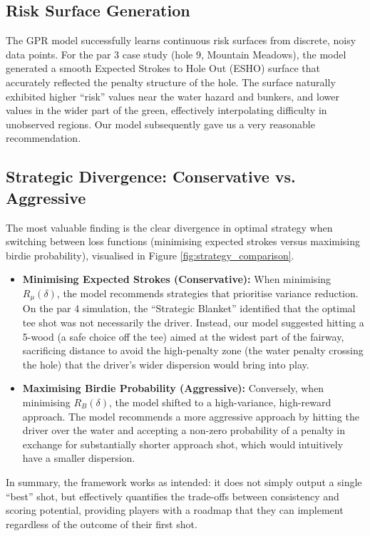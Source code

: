 \documentclass[11pt, letterpaper]{article}
\begin{document}
\subsection{Risk Surface Generation}
The GPR model successfully learns continuous risk surfaces from discrete, noisy data points. For the par 3 case study (hole 9, Mountain Meadows), the model generated a smooth Expected Strokes to Hole Out (ESHO) surface that accurately reflected the penalty structure of the hole. The surface naturally exhibited higher ``risk'' values near the water hazard and bunkers, and lower values in the wider part of the green, effectively interpolating difficulty in unobserved regions. Our model subsequently gave us a very reasonable recommendation.

\subsection{Strategic Divergence: Conservative vs. Aggressive}
The most valuable finding is the clear divergence in optimal strategy when switching between loss functions (minimising expected strokes versus maximising birdie probability), visualised in Figure \ref{fig:strategy_comparison}.

\begin{itemize}
    \item \textbf{Minimising Expected Strokes (Conservative):} When minimising $R_\mu(\delta)$, the model recommends strategies that prioritise variance reduction. On the par 4 simulation, the ``Strategic Blanket'' identified that the optimal tee shot was not necessarily the driver. Instead, our model suggested hitting a 5-wood (a safe choice off the tee) aimed at the widest part of the fairway, sacrificing distance to avoid the high-penalty zone (the water penalty crossing the hole) that the driver's wider dispersion would bring into play. 
    
    \item \textbf{Maximising Birdie Probability (Aggressive):} Conversely, when minimising $R_B(\delta)$, the model shifted to a high-variance, high-reward approach. The model recommends a more aggressive approach by hitting the driver over the water and accepting a non-zero probability of a penalty in exchange for substantially shorter approach shot, which would intuitively have a smaller dispersion.
\end{itemize}

In summary, the framework works as intended: it does not simply output a single ``best'' shot, but effectively quantifies the trade-offs between consistency and scoring potential, providing players with a roadmap that they can implement regardless of the outcome of their first shot.
\end{document}
